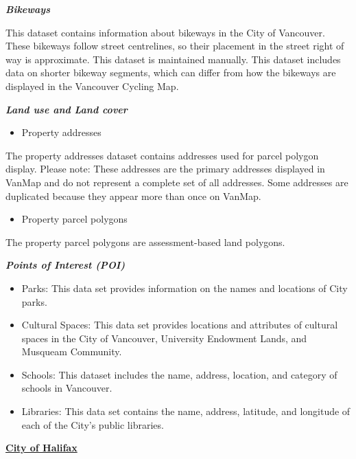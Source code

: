 \documentclass[12pt,twoside]{reedthesis}
\providecommand{\tightlist}{%
  \setlength{\itemsep}{0pt}\setlength{\parskip}{0pt}}
\begin{document}
\textbf{\emph{Bikeways}}

This dataset contains information about bikeways in the City of Vancouver. These bikeways follow street centrelines, so their placement in the street right of way is approximate. This dataset is maintained manually. This dataset includes data on shorter bikeway segments, which can differ from how the bikeways are displayed in the Vancouver Cycling Map.

\textbf{\emph{Land use and Land cover}}
\begin{itemize}
\tightlist
\item
  Property addresses
\end{itemize}
The property addresses dataset contains addresses used for parcel polygon display. Please note: These addresses are the primary addresses displayed in VanMap and do not represent a complete set of all addresses. Some addresses are duplicated because they appear more than once on VanMap.
\begin{itemize}
\tightlist
\item
  Property parcel polygons
\end{itemize}
The property parcel polygons are assessment-based land polygons.

\textbf{\emph{Points of Interest (POI)}}
\begin{itemize}
\item
  Parks: This data set provides information on the names and locations of City parks.
\item
  Cultural Spaces: This data set provides locations and attributes of cultural spaces in the City of Vancouver, University Endowment Lands, and Musqueam Community.
\item
  Schools: This dataset includes the name, address, location, and category of schools in Vancouver.
\item
  Libraries: This data set contains the name, address, latitude, and longitude of each of the City's public libraries.
\end{itemize}
\textbf{\href{https://catalogue-hrm.opendata.arcgis.com/search?tags=Halifax\%20Open\%20Data}{City of Halifax}}
\end{document}
